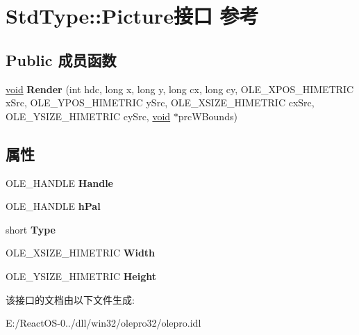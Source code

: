 \hypertarget{interface_std_type_1_1_picture}{}\section{Std\+Type\+:\+:Picture接口 参考}
\label{interface_std_type_1_1_picture}
\subsection*{Public 成员函数}
\begin{DoxyCompactItemize}
\item 
\mbox{\label{interface_std_type_1_1_picture_ab6aaf2d3b4ff1e8ae508ed4ceb6a9668}} 
\hyperlink{interfacevoid}{void} {\bfseries Render} (int hdc, long x, long y, long cx, long cy, O\+L\+E\+\_\+\+X\+P\+O\+S\+\_\+\+H\+I\+M\+E\+T\+R\+IC x\+Src, O\+L\+E\+\_\+\+Y\+P\+O\+S\+\_\+\+H\+I\+M\+E\+T\+R\+IC y\+Src, O\+L\+E\+\_\+\+X\+S\+I\+Z\+E\+\_\+\+H\+I\+M\+E\+T\+R\+IC cx\+Src, O\+L\+E\+\_\+\+Y\+S\+I\+Z\+E\+\_\+\+H\+I\+M\+E\+T\+R\+IC cy\+Src, \hyperlink{interfacevoid}{void} $\ast$prc\+W\+Bounds)
\end{DoxyCompactItemize}
\subsection*{属性}
\begin{DoxyCompactItemize}
\item 
\mbox{\label{interface_std_type_1_1_picture_a7778a9f01a423e1a2ea4ed9b7801759d}} 
O\+L\+E\+\_\+\+H\+A\+N\+D\+LE {\bfseries Handle}
\item 
\mbox{\label{interface_std_type_1_1_picture_aa7f87431d73a1dccd72e619d0dfb11fa}} 
O\+L\+E\+\_\+\+H\+A\+N\+D\+LE {\bfseries h\+Pal}
\item 
\mbox{\label{interface_std_type_1_1_picture_a5a4a05c21fbf8d6281fbf8c658e23a6f}} 
short {\bfseries Type}
\item 
\mbox{\label{interface_std_type_1_1_picture_a2d62fa83489f27fd1d01e698c886ab79}} 
O\+L\+E\+\_\+\+X\+S\+I\+Z\+E\+\_\+\+H\+I\+M\+E\+T\+R\+IC {\bfseries Width}
\item 
\mbox{\label{interface_std_type_1_1_picture_adfa8b40aa546d53d0baab9e1c885dfe0}} 
O\+L\+E\+\_\+\+Y\+S\+I\+Z\+E\+\_\+\+H\+I\+M\+E\+T\+R\+IC {\bfseries Height}
\end{DoxyCompactItemize}


该接口的文档由以下文件生成\+:\begin{DoxyCompactItemize}
\item 
E\+:/\+React\+O\+S-\/0../dll/win32/olepro32/olepro.\+idl\end{DoxyCompactItemize}
